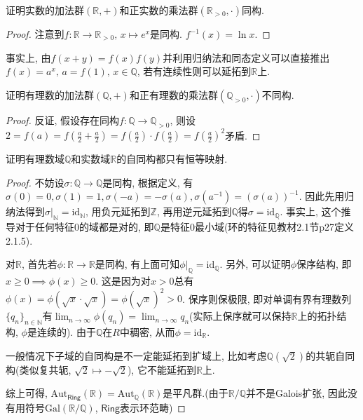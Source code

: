 \begin{problem}
    证明实数的加法群$(\mathbb{R}, +)$和正实数的乘法群$(\mathbb{R}_{>0}, \cdot)$同构.
\end{problem}

\begin{proof}
    注意到$f: \mathbb{R} \to \mathbb{R}_{>0},\, x \mapsto e^x$是同构. $f^{-1}(x) = \ln x$.
\end{proof}

\begin{remark}
    事实上, 由$f(x + y) = f(x)f(y)$并利用归纳法和同态定义可以直接推出$f(x) = a^x,\, a = f(1),\, x \in \mathbb{Q}$, 若有连续性则可以延拓到$\mathbb{R}$上.
\end{remark}

\begin{problem}
    证明有理数的加法群$(\mathbb{Q}, +)$和正有理数的乘法群$(\mathbb{Q}_{>0}, \cdot)$不同构.
\end{problem}

\begin{proof}
    反证, 假设存在同构$f: \mathbb{Q} \to \mathbb{Q}_{>0}$, 则设$2 = f(a) = f(\frac{a}{2} + \frac{a}{2}) = f(\frac{a}{2}) \cdot f(\frac{a}{2}) = f(\frac{a}{2})^2$矛盾.
\end{proof}

\begin{problem}\label{ex:1.4.7}
    证明有理数域$\mathbb{Q}$和实数域$\mathbb{R}$的自同构都只有恒等映射.
\end{problem}

\begin{proof}
    不妨设$\sigma: \mathbb{Q} \to \mathbb{Q}$是同构, 根据定义, 有$\sigma(0) = 0, \sigma(1) = 1, \sigma(-a) = -\sigma(a), \sigma(a^{-1}) = (\sigma(a))^{-1}$. 因此先用归纳法得到$\sigma|_{\mathbb{N}} = \mathrm{id}_{\mathbb{N}}$, 用负元延拓到$\mathbb{Z}$, 再用逆元延拓到$\mathbb{Q}$得$\sigma = \mathrm{id}_{\mathbb{Q}}$. 事实上, 这个推导对于任何特征$0$的域都是对的, 即$\mathbb{Q}$是特征$0$最小域(环的特征见教材2.1节p27定义2.1.5).

    对$\mathbb{R}$, 首先若$\phi: \mathbb{R} \to \mathbb{R}$是同构, 有上面可知$\phi|_{\mathbb{Q}} = \mathrm{id}_{\mathbb{Q}}$. 另外, 可以证明$\phi$保序结构, 即$x \geqslant 0 \implies \phi(x) \geqslant 0$. 这是因为对$x > 0$总有$\phi(x) = \phi(\sqrt{x} \cdot \sqrt{x}) = \phi(\sqrt{x})^2 > 0$. 保序则保极限, 即对单调有界有理数列$\{q_n\}_{n \in \mathbb{N}}$有$\lim_{n \to \infty} \phi(q_n) = \lim_{n \to \infty} q_n$(实际上保序就可以保持$\mathbb{R}$上的拓扑结构, $\phi$是连续的). 由于$\mathbb{Q}$在$R$中稠密, 从而$\phi = \mathrm{id}_{\mathbb{R}}$.

    一般情况下子域的自同构是不一定能延拓到扩域上, 比如考虑$\mathbb{Q}(\sqrt{2})$的共轭自同构(类似复共轭, $\sqrt{2} \mapsto -\sqrt{2}$), 它不能延拓到$\mathbb{R}$上.

    综上可得, $\mathrm{Aut}_{\mathsf{Ring}}(\mathbb{R}) = \mathrm{Aut}_{\mathbb{Q}}(\mathbb{R})$是平凡群.(由于$\mathbb{R}/\mathbb{Q}$并不是Galois扩张, 因此没有用符号$\mathrm{Gal}(\mathbb{R}/\mathbb{Q})$, $\mathsf{Ring}$表示环范畴)
\end{proof}

